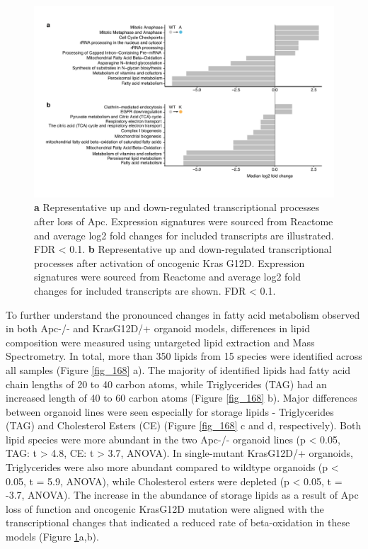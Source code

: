 \begin{flushleft}
\begin{figure}[h]
\centering
\includegraphics[width=\textwidth,
                height=\textheight,
                keepaspectratio]{figures/adenomaprofiling/pdf/fig_1_6_2.pdf}
\caption[Representative up and down-regulated transcriptional processes after loss of Apc and activation of oncogenic Kras G12D]{
\textbf{a} Representative up and down-regulated transcriptional processes after loss of Apc. Expression signatures were sourced from Reactome and average log2 fold changes for included transcripts are illustrated. FDR < 0.1.
\textbf{b} Representative up and down-regulated transcriptional processes after activation of oncogenic Kras G12D. Expression signatures were sourced from Reactome and average log2 fold changes for included transcripts are shown. FDR < 0.1.
}
\label{fig_162}
\end{figure}
\bigbreak

To further understand the pronounced changes in fatty acid metabolism observed in both Apc-/- and KrasG12D/+ organoid models, differences in lipid composition were measured using untargeted lipid extraction and Mass Spectrometry. In total, more than 350 lipids from 15 species were identified across all samples (Figure \ref{fig_168} a). The majority of identified lipids had fatty acid chain lengths of 20 to 40 carbon atoms, while Triglycerides (TAG) had an increased length of 40 to 60 carbon atoms (Figure \ref{fig_168} b). Major differences between organoid lines were seen especially for storage lipids - Triglycerides (TAG) and Cholesterol Esters (CE) (Figure \ref{fig_168} c and d, respectively). Both lipid species were more abundant in the two Apc-/- organoid lines (p < 0.05, TAG: t > 4.8, CE: t > 3.7, ANOVA). In single-mutant KrasG12D/+ organoids, Triglycerides were also more abundant compared to wildtype organoids (p < 0.05, t = 5.9, ANOVA), while Cholesterol esters were depleted (p < 0.05, t = -3.7, ANOVA). The increase in the abundance of storage lipids as a result of Apc loss of function and oncogenic KrasG12D mutation were aligned with the transcriptional changes that indicated a reduced rate of beta-oxidation in these models (Figure \ref{fig_162}a,b). 


\end{flushleft}
